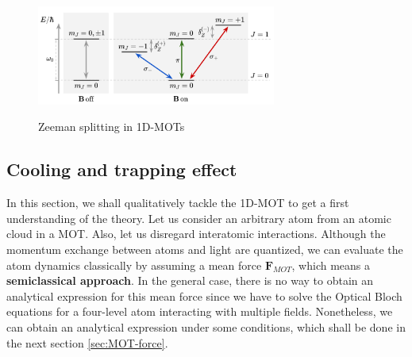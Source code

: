 \begin{figure}[!ht]
	\centering
	\caption{Zeeman splitting in 1D-MOTs}
	\includegraphics[width=0.7\textwidth]{USPSC-img/1D-MOT-Zeeman-splitting.png}
	\vspace{5pt}
	\label{fig:1D-MOT-Zeeman-splitting}
\end{figure}

\subsection{Cooling and trapping effect}
\label{sec:cooling-trapping-effect}

In this section, we shall qualitatively tackle the 1D-MOT to get a first understanding of the theory. Let us consider an arbitrary atom from an atomic cloud in a MOT. Also, let us disregard interatomic interactions. Although the momentum exchange between atoms and light are quantized, we can evaluate the atom dynamics classically by assuming a mean force $ \mathbf{F}_{MOT} $, which means a \textbf{semiclassical approach}. In the general case, there is no way to obtain an analytical expression for this mean force since we have to solve the Optical Bloch equations for a four-level atom interacting with multiple fields. Nonetheless, we can obtain an analytical expression under some conditions, which shall be done in the next section \ref{sec:MOT-force}. 

